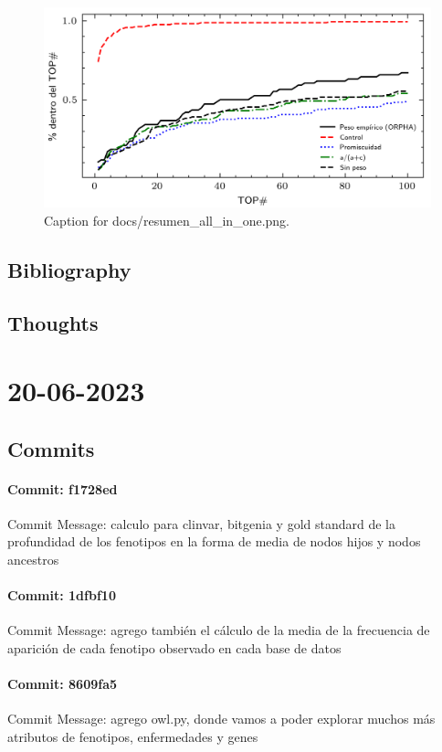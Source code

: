 \documentclass{article}
\begin{document}
\begin{figure}[h] \centering \includegraphics{docs/resumen_all_in_one.png} \caption{Caption for docs/resumen_all_in_one.png.} \end{figure}
\subsection{Bibliography}
\subsection{Thoughts}

\section{20-06-2023}
\subsection{Commits}
\paragraph{Commit: f1728ed}
Commit Message: calculo para clinvar, bitgenia y gold standard de la profundidad de los fenotipos en la forma de media de nodos hijos y nodos ancestros

\paragraph{Commit: 1dfbf10}
Commit Message: agrego también el cálculo de la media de la frecuencia de aparición de cada fenotipo observado en cada base de datos

\paragraph{Commit: 8609fa5}
Commit Message: agrego owl.py, donde vamos a poder explorar muchos más atributos de fenotipos, enfermedades y genes
\end{document}
